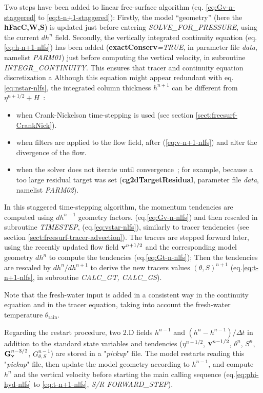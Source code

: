 Two steps have been added to linear free-surface algorithm 
(eq. \ref{eq:Gv-n-staggered} to \ref{eq:t-n+1-staggered}):
Firstly, the model ``geometry''
(here the {\bf hFacC,W,S}) is updated just before entering {\it
SOLVE\_FOR\_PRESSURE}, using the current $dh^{n}$ field.
Secondly, the vertically integrated continuity equation 
(eq.\ref{eq:h-n+1-nlfs}) has been added ({\bf exactConserv}{\em =TRUE},
in parameter file {\em data}, namelist {\em PARM01})
just before computing the vertical velocity, in subroutine
{\em INTEGR\_CONTINUITY}. This ensures that tracer and continuity equation
discretization  a Although this equation might appear 
redundant with eq.\ref{eq:nstar-nlfs}, the integrated column
thickness $h^{n+1}$ can be different from $\eta^{n+1/2} + H$~:
\begin{itemize}
\item when Crank-Nickelson time-stepping is used (see section
\ref{sect:freesurf-CrankNick}).
\item when filters are applied to the flow field, after
(\ref{eq:v-n+1-nlfs}) and alter the divergence of the flow.
\item when the solver does not iterate until convergence~;
 for example, because a too large residual target was set
 ({\bf cg2dTargetResidual}, parameter file {\em data}, namelist
 {\em PARM02}).
\end{itemize}\noindent
In this staggered time-stepping algorithm, the momentum tendencies
are computed using $dh^{n-1}$ geometry factors.
(eq.\ref{eq:Gv-n-nlfs}) and then rescaled in subroutine {\it TIMESTEP},
(eq.\ref{eq:vstar-nlfs}), similarly to tracer tendencies (see section
\ref{sect:freesurf-tracer-advection}).
The tracers are stepped forward later, using the recently updated
flow field ${\bf v}^{n+1/2}$ and the corresponding model geometry
$dh^{n}$ to compute the tendencies (eq.\ref{eq:Gt-n-nlfs});
Then the tendencies are rescaled by $dh^n/dh^{n+1}$ to derive
the new tracers values $(\theta,S)^{n+1}$ (eq.\ref{eq:t-n+1-nlfs},
in subroutine {\em CALC\_GT, CALC\_GS}).

Note that the fresh-water input is added in a consistent way in the 
continuity equation and in the tracer equation, taking into account
the fresh-water temperature $\theta_{\mathrm{rain}}$.

Regarding the restart procedure,
two 2.D fields $h^{n-1}$ and $(h^n-h^{n-1})/\Delta t$ 
in addition to the standard
state variables and tendencies ($\eta^{n-1/2}$, ${\bf v}^{n-1/2}$,
$\theta^n$, $S^n$, ${\bf G}_{\bf v}^{n-3/2}$, $G_{\theta,S}^{n-1}$)
are stored in a "{\em pickup}" file.
The model restarts reading this "{\em pickup}" file,
then update the model geometry according to $h^{n-1}$,
and compute $h^n$ and the vertical velocity
before starting the main calling sequence (eq.\ref{eq:phi-hyd-nlfs} 
to \ref{eq:t-n+1-nlfs}, {\em S/R FORWARD\_STEP}).
\\

